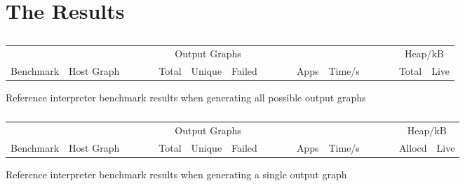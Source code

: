 \section{The Results}\label{the-results}



\begin{table}[h]
\begin{minipage}{\textwidth}
\centering

\begin{tabular}{llcrrrcrrcrr}
\hline 
&  &~~~~& \multicolumn{3}{c}{Output Graphs} &~~~~& & &~~~~& \multicolumn{2}{c}{Heap/kB}\\
Benchmark          & Host Graph\footnotemark & & Total & Unique   & Failed & & Apps & Time/s   & & Total  & Live \\
\hline 

\end{tabular}

\caption[Reference interpreter benchmarks]{Reference interpreter benchmark results when generating all possible output graphs}

\caption*{}

\label{table:resultsAll}
\end{minipage}
\end{table}




\begin{table}[h]
\begin{minipage}{\textwidth}
\centering

\begin{tabular}{llcrrrcrrcrr}
\hline 
&  &~~~~& \multicolumn{3}{c}{Output Graphs} &~~~~& & &~~~~& \multicolumn{2}{c}{Heap/kB}\\
Benchmark          & Host Graph\footnotemark & & Total & Unique   & Failed & & Apps & Time/s   & & Allocd & Live \\
\hline 

\end{tabular}

\caption[Reference interpreter benchmarks]{Reference interpreter benchmark results when generating a single output graph}

\caption*{}

\label{table:resultsSingle}
\end{minipage}
\end{table}




